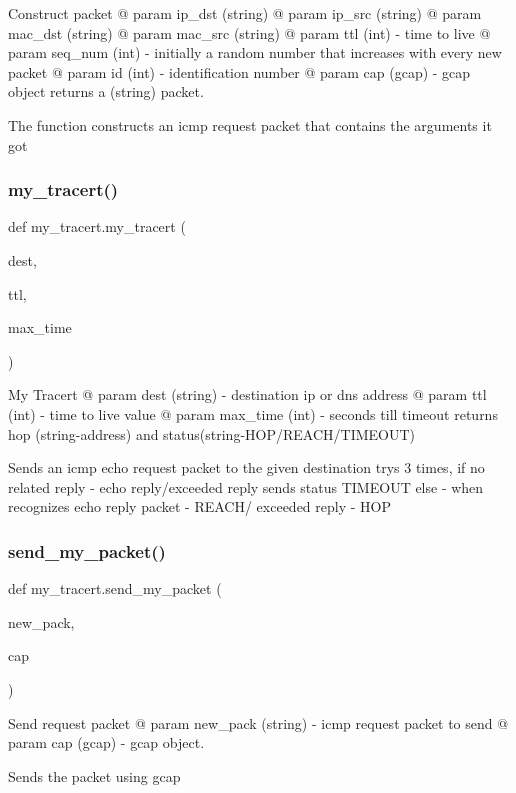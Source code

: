 Construct packet @ param ip\+\_\+dst (string) @ param ip\+\_\+src (string) @ param mac\+\_\+dst (string) @ param mac\+\_\+src (string) @ param ttl (int) -\/ time to live @ param seq\+\_\+num (int) -\/ initially a random number that increases with every new packet @ param id (int) -\/ identification number @ param cap (gcap) -\/ gcap object returns a (string) packet. 

The function constructs an icmp request packet that contains the arguments it got \mbox{\label{namespacemy__tracert_a2dd00edf3b1b902f1c9658f042991fe3}} 
\subsubsection{\texorpdfstring{my\+\_\+tracert()}{my\_tracert()}}
{\footnotesize\ttfamily def my\+\_\+tracert.\+my\+\_\+tracert (\begin{DoxyParamCaption}\item[{}]{dest,  }\item[{}]{ttl,  }\item[{}]{max\+\_\+time }\end{DoxyParamCaption})}



My Tracert @ param dest (string) -\/ destination ip or dns address @ param ttl (int) -\/ time to live value @ param max\+\_\+time (int) -\/ seconds till timeout returns hop (string-\/address) and status(string-\/\+H\+O\+P/\+R\+E\+A\+C\+H/\+T\+I\+M\+E\+O\+UT) 

Sends an icmp echo request packet to the given destination trys 3 times, if no related reply -\/ echo reply/exceeded reply sends status T\+I\+M\+E\+O\+UT else -\/ when recognizes echo reply packet -\/ R\+E\+A\+C\+H/ exceeded reply -\/ H\+OP \mbox{\label{namespacemy__tracert_aee43e0ddf2646c6a5c18a70c8ebd03a4}} 
\subsubsection{\texorpdfstring{send\+\_\+my\+\_\+packet()}{send\_my\_packet()}}
{\footnotesize\ttfamily def my\+\_\+tracert.\+send\+\_\+my\+\_\+packet (\begin{DoxyParamCaption}\item[{}]{new\+\_\+pack,  }\item[{}]{cap }\end{DoxyParamCaption})}



Send request packet @ param new\+\_\+pack (string) -\/ icmp request packet to send @ param cap (gcap) -\/ gcap object. 

Sends the packet using gcap 